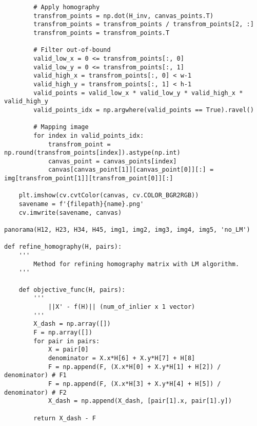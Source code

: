 \documentclass[11pt]{article}
\begin{document}
\begin{lstlisting}
        # Apply homography
        transfrom_points = np.dot(H_inv, canvas_points.T)
        transfrom_points = transfrom_points / transfrom_points[2, :]
        transfrom_points = transfrom_points.T

        # Filter out-of-bound
        valid_low_x = 0 <= transfrom_points[:, 0]
        valid_low_y = 0 <= transfrom_points[:, 1]
        valid_high_x = transfrom_points[:, 0] < w-1
        valid_high_y = transfrom_points[:, 1] < h-1
        valid_points = valid_low_x * valid_low_y * valid_high_x * valid_high_y
        valid_points_idx = np.argwhere(valid_points == True).ravel()

        # Mapping image
        for index in valid_points_idx:
            transfrom_point = np.round(transfrom_points[index]).astype(np.int)
            canvas_point = canvas_points[index]
            canvas[canvas_point[1]][canvas_point[0]][:] = img[transfrom_point[1]][transfrom_point[0]][:]

    plt.imshow(cv.cvtColor(canvas, cv.COLOR_BGR2RGB))
    savename = f'{filepath}{name}.png'
    cv.imwrite(savename, canvas)

panorama(H12, H23, H34, H45, img1, img2, img3, img4, img5, 'no_LM')

def refine_homography(H, pairs):
    '''
        Method for refining homography matrix with LM algorithm.
    '''

    def objective_func(H, pairs):
        ''' 
            ||X' - f(H)|| (num_of_inlier x 1 vector)
        '''
        X_dash = np.array([])
        F = np.array([])
        for pair in pairs:
            X = pair[0]
            denominator = X.x*H[6] + X.y*H[7] + H[8]
            F = np.append(F, (X.x*H[0] + X.y*H[1] + H[2]) / denominator) # F1
            F = np.append(F, (X.x*H[3] + X.y*H[4] + H[5]) / denominator) # F2
            X_dash = np.append(X_dash, [pair[1].x, pair[1].y])
            
        return X_dash - F


\end{lstlisting}
\end{document}
